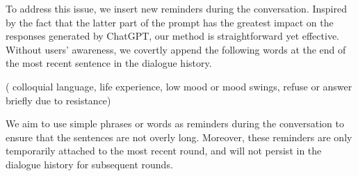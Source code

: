 To address this issue, we insert new reminders during the conversation. Inspired by the fact that the latter part of the prompt has the greatest impact on the responses generated by ChatGPT, our method is straightforward yet effective. Without users' awareness, we covertly append the following words at the end of the most recent sentence in the dialogue history.

\begin{prompt}
    ( colloquial language, life experience, low mood or mood swings, refuse or answer briefly due to resistance)
\end{prompt}

We aim to use simple phrases or words as reminders during the conversation to ensure that the sentences are not overly long. Moreover, these reminders are only temporarily attached to the most recent round, and will not persist in the dialogue history for subsequent rounds.

